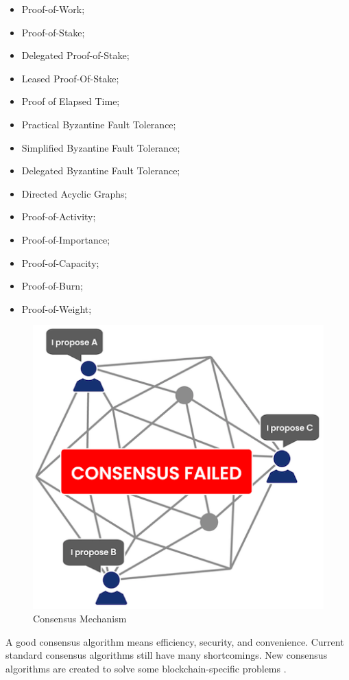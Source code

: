 \begin{itemize}
\item Proof-of-Work;
\item Proof-of-Stake;
\item Delegated Proof-of-Stake;
\item Leased Proof-Of-Stake;
\item Proof of Elapsed Time;
\item Practical Byzantine Fault Tolerance;
\item Simplified Byzantine Fault Tolerance;
\item Delegated Byzantine Fault Tolerance;
\item Directed Acyclic Graphs;
\item Proof-of-Activity;
\item Proof-of-Importance;
\item Proof-of-Capacity;
\item Proof-of-Burn;
\item Proof-of-Weight;
\end{itemize}

\begin{figure}[htbp]
\begin{center}
  \includegraphics[scale=0.55]{images/consensus.png}
\caption{Consensus Mechanism}
\label{fig:Consensus}
\end{center}
\end{figure}

A good consensus algorithm means efficiency, security, and convenience. Current standard consensus algorithms still have many shortcomings. New consensus algorithms are created to solve some blockchain-specific problems \cite{zheng2016blockchain}.

